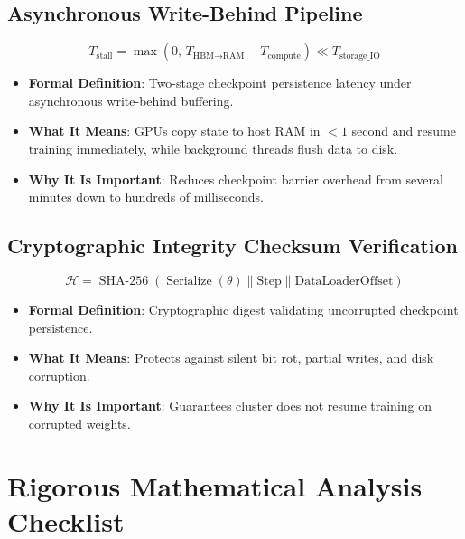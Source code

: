 \documentclass[11pt,a4paper]{article}
\theoremstyle{definition}
\begin{document}
\subsection{Asynchronous Write-Behind Pipeline}
{\boldmath
\begin{equation}
T_{\text{stall}} = \max\left( 0, \, T_{\text{HBM}\to\text{RAM}} - T_{\text{compute}} \right) \ll T_{\text{storage\_IO}}
\end{equation}
}
\begin{itemize}
    \item \textbf{Formal Definition}: Two-stage checkpoint persistence latency under asynchronous write-behind buffering.
    \item \textbf{What It Means}: GPUs copy state to host RAM in $<1$ second and resume training immediately, while background threads flush data to disk.
    \item \textbf{Why It Is Important}: Reduces checkpoint barrier overhead from several minutes down to hundreds of milliseconds.
\end{itemize}

\subsection{Cryptographic Integrity Checksum Verification}
{\boldmath
\begin{equation}
\mathcal{H} = \operatorname{SHA-256}\left( \operatorname{Serialize}(\theta) \parallel \text{Step} \parallel \text{DataLoaderOffset} \right)
\end{equation}
}
\begin{itemize}
    \item \textbf{Formal Definition}: Cryptographic digest validating uncorrupted checkpoint persistence.
    \item \textbf{What It Means}: Protects against silent bit rot, partial writes, and disk corruption.
    \item \textbf{Why It Is Important}: Guarantees cluster does not resume training on corrupted weights.
\end{itemize}

\section{Rigorous Mathematical Analysis Checklist}
\end{document}
